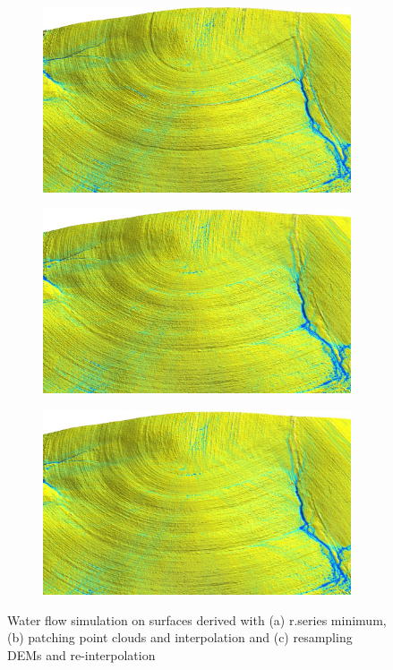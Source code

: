 \documentclass[a4paper,10pt]{article}
\begin{document}
 \begin{figure}
	\centering
	\begin{subfigure}[b]{0.74\textwidth}
 		\includegraphics[width=\textwidth]{img/min}
 		\caption{\label{fig:res_1}}
	\end{subfigure}\hfill%
	\begin{subfigure}[b]{0.74\textwidth}
 		\includegraphics[width=\textwidth]{img/mask_interp}
 		\caption{}
	\end{subfigure}\hfill%
	\begin{subfigure}[b]{0.74\textwidth}
 		\includegraphics[width=\textwidth]{img/sampling}
 		\caption{}
	\end{subfigure}\hfill%
	\caption{Water flow simulation on surfaces derived with 
	(a) r.series minimum, (b) patching point clouds and interpolation
	and (c) resampling DEMs and re-interpolation}
	\label{fig:res}
\end{figure}
\end{document}
